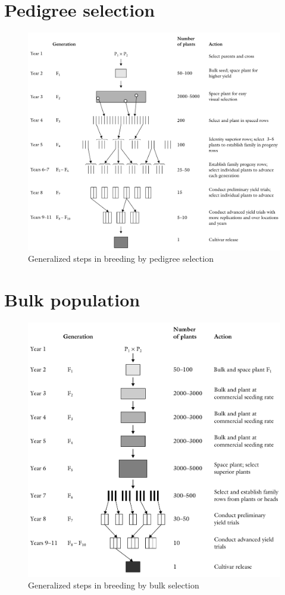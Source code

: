 \documentclass[11pt,ignorenonframetext,aspectratio=169]{beamer}
\begin{document}
\hypertarget{pedigree-selection}{%
\section{Pedigree selection}\label{pedigree-selection}}

\begin{frame}{}
\protect\hypertarget{section-8}{}
\begin{figure}

{\centering \includegraphics[width=0.64\linewidth]{./images/pedigree_selection} 

}

\caption{Generalized steps in breeding by pedigree selection}\label{fig:pedigree-selection}
\end{figure}
\end{frame}

\hypertarget{bulk-population}{%
\section{Bulk population}\label{bulk-population}}

\begin{frame}{}
\protect\hypertarget{section-9}{}
\begin{figure}

{\centering \includegraphics[width=0.56\linewidth]{./images/bulk_selection} 

}

\caption{Generalized steps in breeding by bulk selection}\label{fig:bulk-selection}
\end{figure}
\end{frame}
\end{document}
